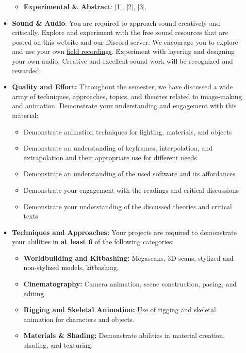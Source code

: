 \begin{itemize}
\begin{itemize}
		      \item \textbf{Experimental \& Abstract}: \href{https://vimeo.com/275668389}{[1]}, \href{https://vimeo.com/238456535}{[2]}, \href{https://vimeo.com/291430458}{[3]},
	      \end{itemize}
	\item \textbf{Sound \& Audio}: You are required to approach sound creatively and critically. Explore and experiment with the free sound resources that are posted on this website and our Discord server. We encourage you to explore and use your own \href{https://en.wikipedia.org/wiki/Field_recording}{field recordings}. Experiment with layering and designing your own audio. Creative and excellent sound work will be recognized and rewarded.
	\item \textbf{Quality and Effort:} Throughout the semester, we have discussed a wide array of techniques, approaches, topics, and theories related to image-making and animation. Demonstrate your understanding and engagement with this material:
	      \begin{itemize}
		      \item Demonstrate animation techniques for lighting, materials, and objects
		      \item Demonstrate an understanding of keyframes, interpolation, and extrapolation and their appropriate use for different needs
		      \item Demonstrate an understanding of the used software and its affordances
		      \item Demonstrate your engagement with the readings and critical discussions
		      \item Demonstrate your understanding of the discussed theories and critical texts
	      \end{itemize}
	\item \textbf{Techniques and Approaches:} Your projects are required to demonstrate your abilities in \textbf{at least 6} of the following categories:
	      \begin{itemize}
		      \item \textbf{Worldbuilding and Kitbashing:} Megascans, 3D scans, stylized and non-stylized models, kitbashing.
		      \item \textbf{Cinematography:} Camera animation, scene construction, pacing, and editing.
		      \item \textbf{Rigging and Skeletal Animation:} Use of rigging and skeletal animation for characters and objects.
		      \item \textbf{Materials \& Shading:} Demonstrate abilities  in material creation, shading, and texturing.

\end{itemize}
\end{itemize}
